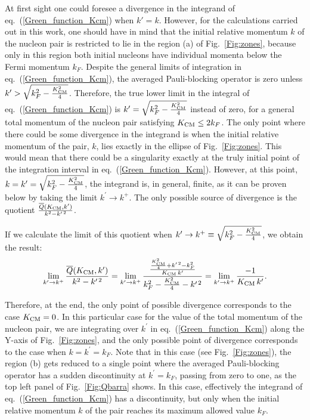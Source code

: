 \documentclass[aps,twocolumn,showpacs,preprintnumbers,amsmath,amssymb,nofootinbib,superscriptaddress,showkeys,noeprint]{revtex4-1}
\begin{document}
At first sight one could foresee a divergence in the integrand of
eq.~(\ref{Green_function_Kcm}) when $k'=k$.  However, for the
calculations carried out in this work, one should have in mind that
the initial relative momentum $k$ of the nucleon pair is restricted to
lie in the region (a) of Fig.~\ref{Fig:zones}, because only in this
region both initial nucleons have individual momenta below the Fermi
momentum $k_F$.  Despite the general limits of integration in
eq.~(\ref{Green_function_Kcm}), the averaged Pauli-blocking operator
is zero unless $k^\prime>\sqrt{k^2_F-\frac{K^2_{\rm CM}}{4}}$.
Therefore, the true lower limit in the integral of
eq.~(\ref{Green_function_Kcm}) is $k^\prime=\sqrt{k^2_F-\frac{K^2_{\rm
      CM}}{4}}$ instead of zero, for a general total momentum of the
nucleon pair satisfying $K_{\rm CM}\le 2k_F$. The only point where
there could be some divergence in the integrand is when the initial
relative momentum of the pair, $k$, lies exactly in the ellipse of
Fig.~\ref{Fig:zones}. This would mean that there could be a
singularity exactly at the truly initial point of the integration
interval in eq.~(\ref{Green_function_Kcm}). However, at this point,
$k=k^\prime= \sqrt{k^2_F-\frac{K^2_{\rm CM}}{4}}$, the integrand is,
in general, finite, as it can be proven below by taking the limit
$k^\prime \rightarrow k^{+}$.  The only possible source of divergence
is the quotient $\frac{\overline{Q}(K_{\rm
    CM},k^\prime)}{k^2-k^{\prime\,2}}$.

If we calculate the limit of this quotient when $k^\prime \rightarrow
k^{+}\equiv \sqrt{k^2_F-\frac{K^2_{\rm CM}}{4}}$, we obtain the
result:
\begin{equation*}
 \lim_{k^\prime \rightarrow k^{+}}
 \frac{\overline{Q}(K_{\rm CM},k^\prime)}{k^2-k^{\prime\,2}}=
 \lim_{k^\prime \rightarrow k^{+}}
 \frac{\frac{\frac{K^2_{\rm CM}}{4}+k^{\prime\,2}-k^2_F}{K_{\rm CM}\,k^\prime}}{k^2_F-\frac{K^2_{\rm CM}}{4}-k^{\prime\,2}}=
 \lim_{k^\prime \rightarrow k^{+}}
 \frac{-1}{K_{\rm CM}\,k^\prime}.
\end{equation*}


Therefore, at the end, the only point of possible divergence
corresponds to the case $K_{\rm CM}=0$. In this particular case for
the value of the total momentum of the nucleon pair, we are
integrating over $k^\prime$ in eq.~(\ref{Green_function_Kcm}) along
the Y-axis of Fig.~\ref{Fig:zones}, and the only possible point of
divergence corresponds to the case when $k=k^\prime=k_F$. Note that in
this case (see Fig.~\ref{Fig:zones}), the region (b) gets reduced to a
single point where the averaged Pauli-blocking operator has a sudden
discontinuity at $k^\prime=k_F$, passing from zero to one, as the top
left panel of Fig.~\ref{Fig:Qbarra} shows. In this case, effectively
the integrand of eq.~(\ref{Green_function_Kcm}) has a discontinuity,
but only when the initial relative momentum $k$ of the pair reaches
its maximum allowed value $k_F$.
\end{document}
